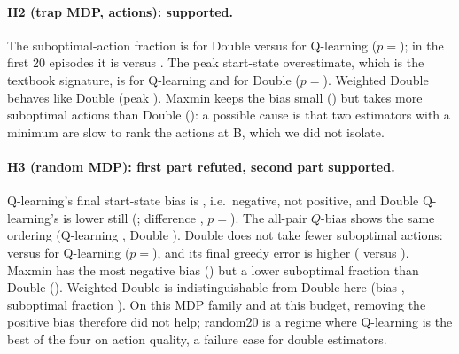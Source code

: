 \paragraph{H2 (trap MDP, actions): supported.} The suboptimal-action fraction is  for Double versus  for Q-learning ($p=$); in the first 20 episodes it is  versus . The peak start-state overestimate, which is the textbook signature, is  for Q-learning and  for Double ($p=$). Weighted Double behaves like Double (peak ). Maxmin keeps the bias small () but takes more suboptimal actions than Double (): a possible cause is that two estimators with a minimum are slow to rank the actions at B, which we did not isolate.

\paragraph{H3 (random MDP): first part refuted, second part supported.} Q-learning's final start-state bias is , i.e.\ negative, not positive, and Double Q-learning's is lower still (; difference , $p=$). The all-pair $Q$-bias shows the same ordering (Q-learning , Double ). Double does not take fewer suboptimal actions:  versus  for Q-learning ($p=$), and its final greedy error is higher ( versus ). Maxmin has the most negative bias () but a lower suboptimal fraction than Double (). Weighted Double is indistinguishable from Double here (bias , suboptimal fraction ). On this MDP family and at this budget, removing the positive bias therefore did not help; random20 is a regime where Q-learning is the best of the four on action quality, a failure case for double estimators.

